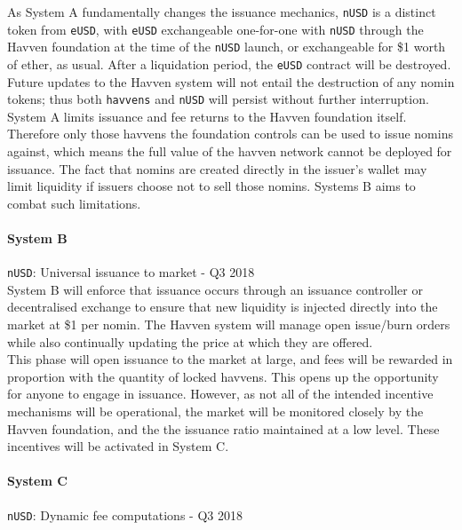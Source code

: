 \noindent As System A fundamentally changes the issuance mechanics, \texttt{nUSD} is a distinct
token from \texttt{eUSD}, with \texttt{eUSD} exchangeable one-for-one with \texttt{nUSD}
through the Havven foundation at the time of the \texttt{nUSD} launch, or exchangeable
for \$1 worth of ether, as usual. After a liquidation period, the \texttt{eUSD} contract
will be destroyed.
Future updates to the Havven system will not entail the destruction of any nomin tokens; thus
both \texttt{havvens} and \texttt{nUSD} will persist without further interruption. \\

\noindent System A limits issuance and fee returns to the Havven foundation itself. Therefore
only those havvens the foundation controls can be used to issue nomins against, which means
the full value of the havven network cannot be deployed for issuance. The fact that nomins
are created directly in the issuer's wallet may limit liquidity if issuers choose not to sell
those nomins. Systems B aims to combat such limitations. \\


\paragraph{System B} \texttt{nUSD}: Universal issuance to market - Q3 2018 \\

\noindent System B will enforce that issuance occurs through an issuance controller or
decentralised exchange to ensure that new liquidity is injected directly
into the market at \$1 per nomin. The Havven system will manage open
issue/burn orders while also continually updating the price at which they are
offered. \\

\noindent This phase will open issuance to the market at large, and fees will be rewarded
in proportion with the quantity of locked havvens. This opens up the opportunity
for anyone to engage in issuance. However, as not all of the intended incentive
mechanisms will be operational, the market will be monitored closely by the Havven
foundation, and the the issuance ratio maintained at a low level. These incentives will
be activated in System C. \\


\paragraph{System C} \texttt{nUSD}: Dynamic fee computations - Q3 2018 \\

